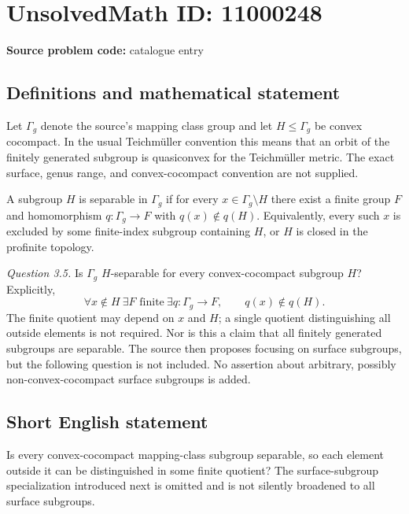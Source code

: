 \documentclass[11pt]{article}
\begin{document}
\section*{UnsolvedMath ID: 11000248}
\textbf{Source problem code:} catalogue entry
\subsection{Definitions and mathematical statement}
Let \(\Gamma_g\) denote the source's mapping class group and let \(H\leq\Gamma_g\) be convex cocompact. In the usual Teichm\"uller convention this means that an orbit of the finitely generated subgroup is quasiconvex for the Teichm\"uller metric. The exact surface, genus range, and convex-cocompact convention are not supplied.

A subgroup \(H\) is separable in \(\Gamma_g\) if for every \(x\in\Gamma_g\setminus H\) there exist a finite group \(F\) and homomorphism \(q:\Gamma_g\to F\) with \(q(x)\notin q(H)\). Equivalently, every such \(x\) is excluded by some finite-index subgroup containing \(H\), or \(H\) is closed in the profinite topology.

\emph{Question 3.5.} Is \(\Gamma_g\) \(H\)-separable for every convex-cocompact subgroup \(H\)? Explicitly,
\[
 \forall x\notin H\ \exists F\text{ finite}\ \exists q:\Gamma_g\to F,
 \qquad q(x)\notin q(H).
\]
The finite quotient may depend on \(x\) and \(H\); a single quotient distinguishing all outside elements is not required. Nor is this a claim that all finitely generated subgroups are separable. The source then proposes focusing on surface subgroups, but the following question is not included. No assertion about arbitrary, possibly non-convex-cocompact surface subgroups is added.
\subsection{Short English statement}
Is every convex-cocompact mapping-class subgroup separable, so each element outside it can be distinguished in some finite quotient? The surface-subgroup specialization introduced next is omitted and is not silently broadened to all surface subgroups.
\end{document}
